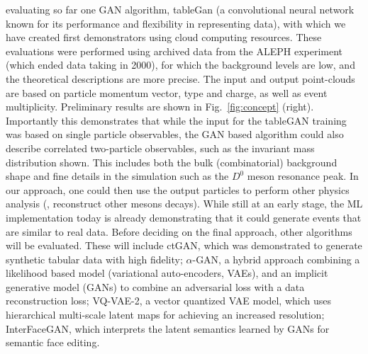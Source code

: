 evaluating so far one GAN algorithm, tableGan (a convolutional neural network known for its performance and flexibility in representing data), with which we have created first demonstrators using cloud computing resources. These evaluations were performed using {\eecol} archived data from the ALEPH experiment (which ended data taking in 2000), for which the background levels are low, and the theoretical descriptions are more precise. The input and output point-clouds are based on particle momentum vector,  type and charge, as well as event multiplicity. Preliminary results are shown in Fig.~\ref{fig:concept} (right). Importantly this demonstrates that while the input for the tableGAN training was based on single particle observables, the GAN based algorithm could also describe correlated two-particle observables, such as the invariant mass distribution shown. This includes both the bulk (combinatorial) background shape and fine details in the simulation such as the $D^0$ meson resonance peak. In our approach, one could then use the output particles to perform other physics analysis (\eg, reconstruct other mesons decays). While still at an early stage, the ML implementation today is already demonstrating that it could generate {\eecol} events that are similar to real data. Before deciding on the final approach, other algorithms will be evaluated. These will include ctGAN, which was demonstrated to generate synthetic tabular data with high fidelity; $\alpha$-GAN, a hybrid approach combining a likelihood based model (variational auto-encoders, VAEs), and an implicit generative model (GANs) to combine an adversarial loss with a data reconstruction loss; VQ-VAE-2, a vector quantized VAE model, which uses hierarchical multi-scale latent maps for achieving an increased resolution; InterFaceGAN, which interprets the latent semantics learned by GANs for semantic face editing. 


